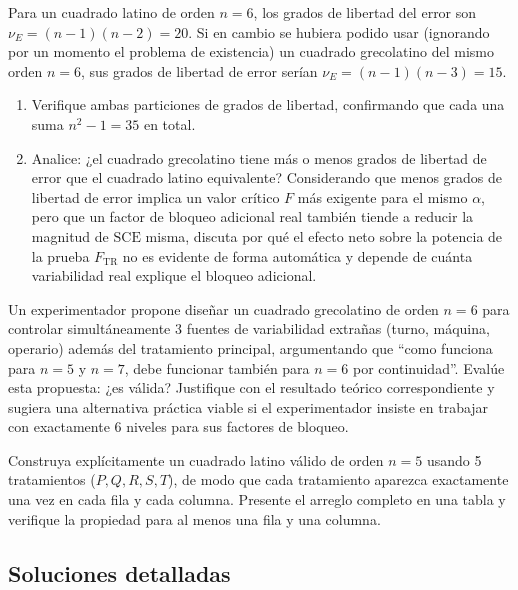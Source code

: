 \begin{problema}
	\label{prob:68ab492}
	Para un cuadrado latino de orden $n = 6$, los grados de libertad del error son $\nu_E = (n-1)(n-2) = 20$. Si en cambio se hubiera podido usar (ignorando por un momento el problema de existencia) un cuadrado grecolatino del mismo orden $n=6$, sus grados de libertad de error serían $\nu_E = (n-1)(n-3) = 15$.
	\begin{enumerate}
		\item Verifique ambas particiones de grados de libertad, confirmando que cada una suma $n^2 - 1 = 35$ en total.
		\item Analice: ¿el cuadrado grecolatino tiene más o menos grados de libertad de error que el cuadrado latino equivalente? Considerando que menos grados de libertad de error implica un valor crítico $F$ más exigente para el mismo $\alpha$, pero que un factor de bloqueo adicional real también tiende a reducir la magnitud de $\text{SCE}$ misma, discuta por qué el efecto neto sobre la potencia de la prueba $F_{\text{TR}}$ no es evidente de forma automática y depende de cuánta variabilidad real explique el bloqueo adicional.
	\end{enumerate}
\end{problema}

\begin{problema}
	\label{prob:19cbc65}
	Un experimentador propone diseñar un cuadrado grecolatino de orden $n = 6$ para controlar simultáneamente 3 fuentes de variabilidad extrañas (turno, máquina, operario) además del tratamiento principal, argumentando que ``como funciona para $n=5$ y $n=7$, debe funcionar también para $n=6$ por continuidad''. Evalúe esta propuesta: ¿es válida? Justifique con el resultado teórico correspondiente y sugiera una alternativa práctica viable si el experimentador insiste en trabajar con exactamente 6 niveles para sus factores de bloqueo.
\end{problema}

\begin{problema}
	\label{prob:c1de238}
	Construya explícitamente un cuadrado latino válido de orden $n = 5$ usando 5 tratamientos ($P, Q, R, S, T$), de modo que cada tratamiento aparezca exactamente una vez en cada fila y cada columna. Presente el arreglo completo en una tabla y verifique la propiedad para al menos una fila y una columna.
\end{problema}

\subsection*{Soluciones detalladas}

